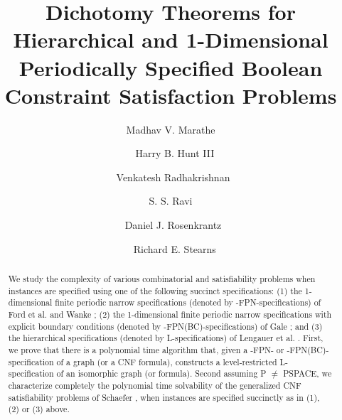 \documentclass{svproc}
\newcounter{program}
\begin{document}
\title{Dichotomy Theorems for Hierarchical and 1-Dimensional Periodically Specified Boolean Constraint Satisfaction Problems}

\author{ Madhav V. Marathe 
       \and{~} Harry B. Hunt III
        \and {~}Venkatesh Radhakrishnan   %
       \and{\newline} S. S. Ravi
       \and  {~}Daniel J. Rosenkrantz
        \and {~}  Richard E. Stearns
}


\maketitle



\begin{abstract}
We study the complexity of various combinatorial and satisfiability problems
when instances are specified using one of the following succinct 
specifications:
(1) the 1-dimensional finite periodic narrow specifications 
(denoted by {-FPN}-specifications)  of  
 Ford  et al. and Wanke \cite{FF58,Wa93};
(2) the 1-dimensional finite periodic narrow specifications with explicit
boundary conditions 
(denoted by {-FPN(BC)}-specifications) of Gale \cite{Ga59}; 
and  
(3) the hierarchical specifications (denoted by {\sf L}-specifications)
of Lengauer et al. \cite{LW87a}.
First, we prove that there is a polynomial time algorithm that,
given a {-FPN}- or {-FPN(BC)}-specification of a graph 
(or a {\sf CNF} formula), constructs a level-restricted {\sf L}-specification
of an isomorphic graph (or formula). Second assuming {\sf P} $\neq$
 {\sf PSPACE},  we characterize completely the polynomial time 
solvability of the generalized {\sf CNF} satisfiability problems of 
Schaefer \cite{Sc78}, when instances are specified succinctly
as in (1), (2) or (3) above.
\end{abstract}
\end{document}
